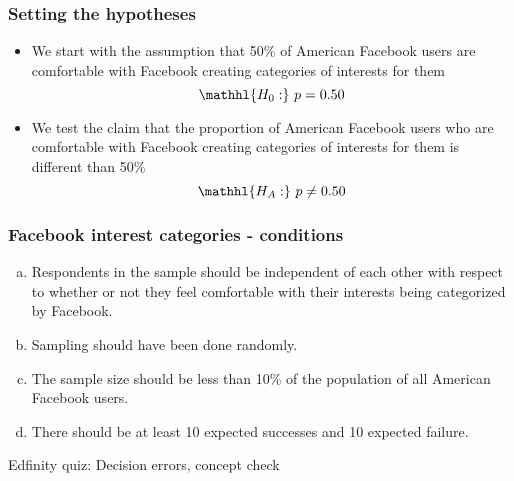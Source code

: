 \documentclass[t,compress,mathserif]{beamer}
\begin{document}

\begin{frame}
\frametitle{Setting the hypotheses}

\begin{itemize}

\item We start with the assumption that 50\% of American Facebook users are comfortable with Facebook creating categories of interests for them
\[ \mathhl{H_0:}~p = 0.50 \]

\pause

\item We test the claim that the proportion of American Facebook users who are comfortable with Facebook creating categories of interests for them is different than 50\%
\[ \mathhl{H_A:}~p \ne 0.50 \]

\end{itemize}

\end{frame}


\begin{frame}
\frametitle{Facebook interest categories - conditions}


\begin{enumerate}[(a)]
\item Respondents in the sample should be independent of each other with respect to whether or not they feel comfortable with their interests being categorized by Facebook.
\item Sampling should have been done randomly.
\item The sample size should be less than 10\% of the population of all American Facebook users.
\item There should be at least 10 expected successes and 10 expected failure.
\end{enumerate}

\end{frame}


Edfinity quiz: Decision errors, concept check

\end{document}
